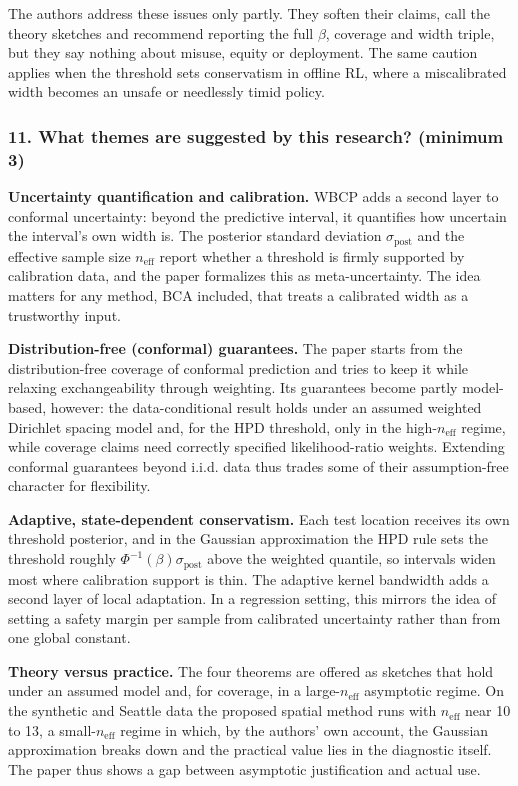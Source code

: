 \documentclass[11pt]{article}
\newcommand{\question}[1]{\subsubsection*{#1}}
\begin{document}
The authors address these issues only partly. They soften their claims, call the theory sketches and recommend reporting the full \ensuremath{\beta}, coverage and width triple, but they say nothing about misuse, equity or deployment. The same caution applies when the threshold sets conservatism in offline RL, where a miscalibrated width becomes an unsafe or needlessly timid policy.

\question{11. What themes are suggested by this research? (minimum 3)}

\textbf{Uncertainty quantification and calibration.} WBCP adds a second layer to conformal uncertainty: beyond the predictive interval, it quantifies how uncertain the interval's own width is. The posterior standard deviation $\sigma_{\mathrm{post}}$ and the effective sample size $n_{\mathrm{eff}}$ report whether a threshold is firmly supported by calibration data, and the paper formalizes this as meta-uncertainty. The idea matters for any method, BCA included, that treats a calibrated width as a trustworthy input.

\textbf{Distribution-free (conformal) guarantees.} The paper starts from the distribution-free coverage of conformal prediction and tries to keep it while relaxing exchangeability through weighting. Its guarantees become partly model-based, however: the data-conditional result holds under an assumed weighted Dirichlet spacing model and, for the HPD threshold, only in the high-$n_{\mathrm{eff}}$ regime, while coverage claims need correctly specified likelihood-ratio weights. Extending conformal guarantees beyond i.i.d. data thus trades some of their assumption-free character for flexibility.

\textbf{Adaptive, state-dependent conservatism.} Each test location receives its own threshold posterior, and in the Gaussian approximation the HPD rule sets the threshold roughly $\Phi^{-1}(\beta)\sigma_{\mathrm{post}}$ above the weighted quantile, so intervals widen most where calibration support is thin. The adaptive kernel bandwidth adds a second layer of local adaptation. In a regression setting, this mirrors the idea of setting a safety margin per sample from calibrated uncertainty rather than from one global constant.

\textbf{Theory versus practice.} The four theorems are offered as sketches that hold under an assumed model and, for coverage, in a large-$n_{\mathrm{eff}}$ asymptotic regime. On the synthetic and Seattle data the proposed spatial method runs with $n_{\mathrm{eff}}$ near 10 to 13, a small-$n_{\mathrm{eff}}$ regime in which, by the authors' own account, the Gaussian approximation breaks down and the practical value lies in the diagnostic itself. The paper thus shows a gap between asymptotic justification and actual use.
\end{document}
